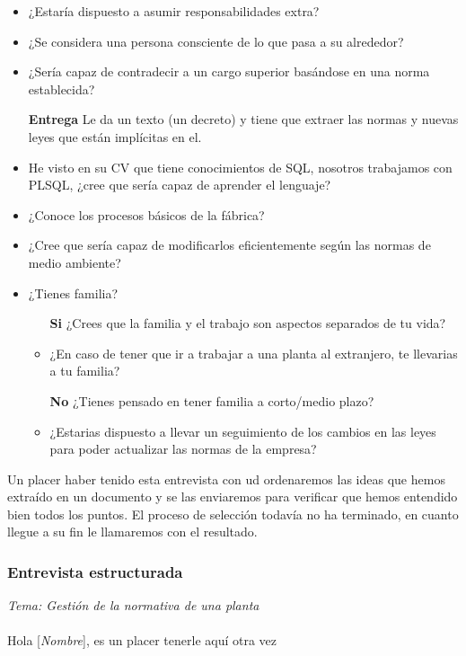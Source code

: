 \documentclass[a4paper]{article}
\begin{document}
\begin{itemize}
	\item ¿Estaría dispuesto a asumir responsabilidades extra?
	\item ¿Se considera una persona consciente de lo que pasa a su alrededor?
	\item ¿Sería capaz de contradecir a un cargo superior basándose en una norma establecida?
	\item[\textbf{Entrega}] Le da un texto (un decreto) y tiene que extraer las normas y nuevas leyes que están implícitas en el.
	\item He visto en su CV que tiene conocimientos de SQL, nosotros trabajamos con PLSQL, ¿cree que sería capaz de aprender el lenguaje?
	\item ¿Conoce los procesos básicos de la fábrica?
	\item ¿Cree que sería capaz de modificarlos eficientemente según las normas de medio ambiente?
	\item ¿Tienes familia?
	\begin{itemize}		
		\item[\textbf{Si}] ¿Crees que la familia y el trabajo son aspectos separados de tu vida?
		\item ¿En caso de tener que ir a trabajar a una planta al extranjero, te llevarias a tu familia?
		\item[\textbf{No}] ¿Tienes pensado en tener familia a corto/medio plazo?
		\item ¿Estarias dispuesto a llevar un seguimiento de los cambios en las leyes para poder actualizar las normas de la empresa?
	\end{itemize}
\end{itemize}
Un placer haber tenido esta entrevista con ud ordenaremos las ideas que hemos extraído en un documento y se las enviaremos para verificar que hemos entendido bien todos los puntos. El proceso de selección todavía no ha terminado, en cuanto llegue a su fin le llamaremos con el resultado.

\subsubsection{Entrevista estructurada}
\textit{Tema: Gestión de la normativa de una planta}\\\\
Hola [\textit{Nombre}], es un placer tenerle aquí otra vez


\end{document}
